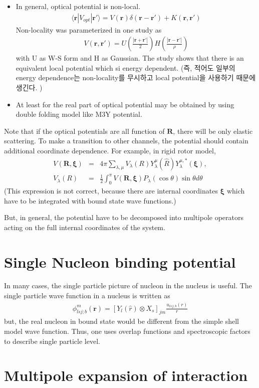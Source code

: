 \documentclass[11pt]{book}
\def\bm{\boldsymbol}
\def\vr{{\bm r}}
\def\la{\langle}
\def\ra{\rangle}
\newcommand{\bea}{\begin{eqnarray}}
\newcommand{\eea}{\end{eqnarray}}
\newcommand{\no}{\nonumber \\}
\begin{document}
\begin{itemize}
\item In general, optical potential is non-local. 
    \bea 
    \la \vr|V_{opt}|\vr'\ra = V(\vr)\delta(\vr-\vr')+K(\vr,\vr') 
    \eea  
    Non-locality was parameterized in one study as
    \bea 
    V(\vr,\vr') = U(\frac{|\vr+\vr'|}{2}) H(\frac{|\vr-\vr'|}{\rho})
    \eea  
    with U as W-S form and H as Gaussian. The study shows that there is an equivalent local
    potential which si energy dependent. (즉, 적어도 일부의 energy dependence는 
    non-locality를 무시하고 local potential을 사용하기 때문에 생긴다. )
\item At least for the real part of optical potential may be obtained by using double folding model like M3Y potential.     
\end{itemize}

Note that if the optical potentials are all function of ${\bm R}$,
there will be only elastic scattering. To make a transition to 
other channels, the potential should contain additional coordinate
dependence. For example, in rigid rotor model,
\bea 
V({\bm R},{\bm \xi})&=&4\pi\sum_{\lambda,\mu } V_\lambda(R)Y_\lambda^{\mu}(\hat{R})
                      Y_\lambda^{\mu,*}({\bm \xi}),\no 
V_\lambda(R)&=&\frac{1}{2}\int_0^\pi V({\bm R},{\bm \xi})P_\lambda(\cos\theta) \sin\theta d\theta                       
\eea 
(This expression is not correct, because there are internal coordinates ${\bm \xi}$
which have to be integrated with bound state wave functions.)

But, in general, the potential have to be decomposed into multipole operators
acting on the full internal coordinates of the system. 

\section{Single Nucleon binding potential}
In many cases, the single particle picture of nucleon in the nucleus is useful.
The single particle wave function in a nucleus is written as
\bea 
\phi_{lsj;b}^m(\vr)=[Y_{l}(\hat{r})\otimes X_s]_{jm} \frac{u_{lsj;b}(r)}{r}
\eea 
but, the real nucleon in bound state would be different from the 
simple shell model wave function. Thus, one uses overlap functions
and spectroscopic factors to describe single particle level.  

\section{Multipole expansion of interaction}
\end{document}
